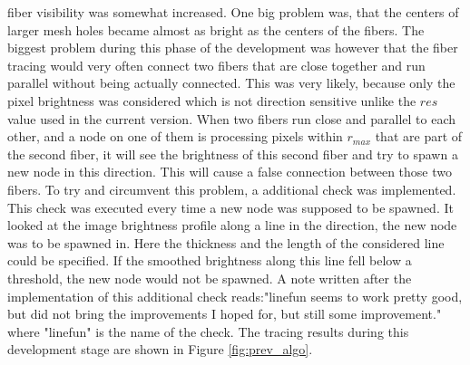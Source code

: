 \documentclass[12pt,english,twocolumn]{revtex4}
\begin{document}
fiber visibility was somewhat increased. One big problem was, that the centers of larger mesh holes became almost as bright as the centers of the fibers. The biggest problem during this phase of the development was however that the fiber tracing would very often connect two fibers that are close together and run parallel without being actually connected. This was very likely, because only the pixel brightness was considered which is not direction sensitive unlike the $res$ value used in the current version. When two fibers run close and parallel to each other, and a node on one of them is processing pixels within $r_{max}$ that are part of the second fiber, it will see the brightness of this second fiber and try to spawn a new node in this direction. This will cause a false connection between those two fibers. To try and circumvent this problem, a additional check was implemented. This check was executed every time a new node was supposed to be spawned. It looked at the image brightness profile along a line in the direction, the new node was to be spawned in. Here the thickness and the length of the considered line could be specified. If the smoothed brightness along this line fell below a threshold, the new node would not be spawned. A note written after the implementation of this additional check reads:"linefun seems to work pretty good, but did not bring the improvements I hoped for, but still some improvement." where "linefun" is the name of the check. The tracing results during this development stage are shown in Figure \ref{fig:prev_algo}.\\
\end{document}

